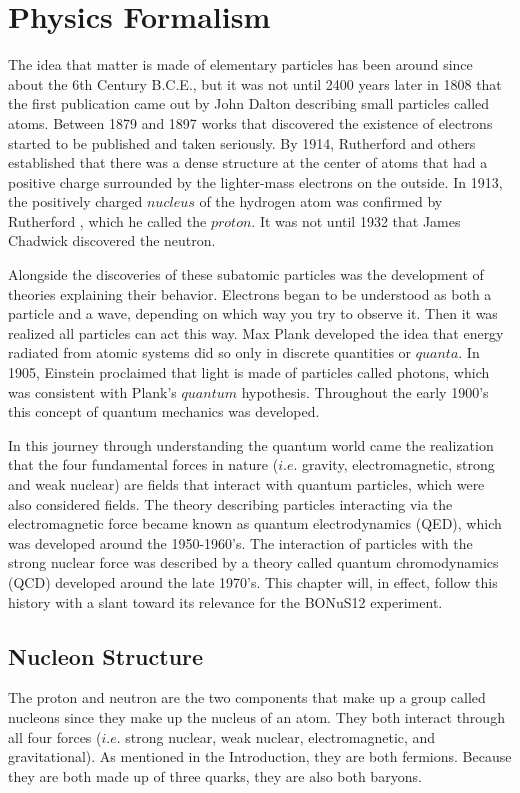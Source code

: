 \chapter{Physics Formalism}
\label{ch:physrev}
The idea that matter is made of elementary particles has been around since about the 6th Century B.C.E., but it was not until 2400 years later in 1808 \cite{book:dalton} that the first publication came out by John Dalton describing small particles called atoms. Between 1879 \cite{crookes} and 1897 \cite{thomson} works that discovered the existence of electrons started to be published and taken seriously. By 1914, Rutherford \cite{book:rutherford1} and others established that there was a dense structure at the center of atoms that had a positive charge surrounded by the lighter-mass electrons on the outside. In 1913, the positively charged $nucleus$ of the hydrogen atom was confirmed by Rutherford \cite{book:rutherford2}, which he called the $proton$. It was not until 1932 that James Chadwick discovered the neutron.

Alongside the discoveries of these subatomic particles was the development of theories explaining their behavior. Electrons began to be understood as both a particle and a wave, depending on which way you try to observe it. Then it was realized all particles can act this way. Max Plank developed the idea that energy radiated from atomic systems did so only in discrete quantities or $quanta$. In 1905, Einstein \cite{einstein} proclaimed that light is made of particles called photons, which was consistent with Plank's $quantum$ hypothesis. Throughout the early 1900's this concept of quantum mechanics was developed.

In this journey through understanding the quantum world came the realization that the four fundamental forces in nature ($i.e.$ gravity, electromagnetic, strong and weak nuclear) are fields that interact with quantum particles, which were also considered fields. The theory describing particles interacting via the electromagnetic force became known as quantum electrodynamics (QED), which was developed around the 1950-1960's. The interaction of particles with the strong nuclear force was described by a theory called quantum chromodynamics (QCD) developed around the late 1970's. This chapter will, in effect, follow this history with a slant toward its relevance for the BONuS12 experiment.

\newpage
\section{Nucleon Structure}
The proton and neutron are the two components that make up a group called nucleons since they make up the nucleus of an atom. They both interact through all four forces ($i.e.$ strong nuclear, weak nuclear, electromagnetic, and gravitational). As mentioned in the Introduction, they are both fermions. Because they are both made up of three quarks, they are also both baryons.

